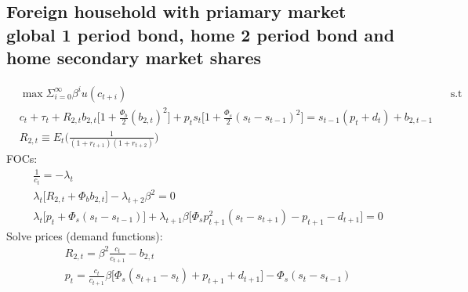 \documentclass[a4paper]{article}
\begin{document}
\subsection{Foreign household with priamary market global 1 period bond, home 2 period bond and home secondary market shares}
\begin{align}
&\max \Sigma_{i=0}^\infty \beta^i u(c_{t+i}) &&\text{s.t}\\
&c_t+\tau_t+R_{2,t} b_{2,t} \big[1+ \frac{\Phi_b}{2}(b_{2,t})^2 \big] + p_ts_t\big[1+\frac{\Phi_s}{2}(s_t-s_{t-1})^2\big]=s_{t-1} (p_t+d_t) + b_{2,t-1}\\
&R_{2,t} \equiv E_t\bigg(\frac{1}{(1+r_{t+1})(1+r_{t+2})} \bigg)
\end{align}
FOCs:
\begin{align}
&\frac{1}{c_t}=-\lambda_t\\
&\lambda_t\big[R_{2,t}+\Phi_b b_{2,t}\big]-\lambda_{t+2}\beta^2=0\\
&\lambda_t \big[p_t + \Phi_s (s_t-s_{t-1})\big] + \lambda_{t+1} \beta \big[\Phi_s p_{t+1}^2 (s_t-s_{t+1}) - p_{t+1}-d_{t+1}\big]=0
\end{align}
Solve prices (demand functions):
\begin{align}
&R_{2,t}=\beta^2\frac{c_t}{c_{t+1}}-b_{2,t}\\
&p_t=\frac{c_t}{c_{t+1}}\beta \bigg[ \Phi_s (s_{t+1}-s_t)+p_{t+1}+d_{t+1} \bigg] - \Phi_s (s_t - s_{t-1})
\end{align}
\end{document}
